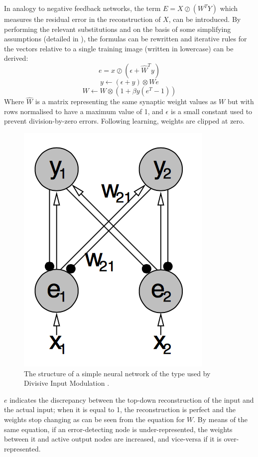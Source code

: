 \documentclass[a4paper,12pt]{article}
\begin{document}
		In analogy to negative feedback networks, the term $E = X \oslash (W^T Y)$ which measures the residual error in the reconstruction of $X$, can be introduced.
		By performing the relevant substitutions and on the basis of some simplifying assumptions (detailed in \cite{spratling2009unsupervised}), the formulas can be rewritten
		and iterative rules for the vectors relative to a single training image (written in lowercase) can be derived:
		$$e = x \oslash (\epsilon + \hat{W}^T y)$$
		$$y \leftarrow (\epsilon + y) \otimes We$$
		$$W \leftarrow W \otimes (1 + \beta y (e^T - 1))$$
		Where $\hat{W}$ is a matrix representing the same synaptic weight values as $W$ but with rows normalised to have a maximum value of 1, and $\epsilon$
		is a small constant used to prevent division-by-zero errors. Following learning, weights are clipped at zero.
		\begin{figure}[H]
  			\centering
			\includegraphics[scale=0.5]{nn}
			\caption{The structure of a simple neural network of the type used by Divisive Input Modulation \cite{spratling2009unsupervised}.}
		\end{figure}
		$e$ indicates the discrepancy between the top-down reconstruction of the input and the actual input; when it is equal to 1, the reconstruction is perfect and the weights
		stop changing as can be seen from the equation for $W$. By means of the same equation, if an error-detecting node is under-represented, the weights between it
		and active output nodes are increased, and vice-versa if it is over-represented. 
		
\end{document}
